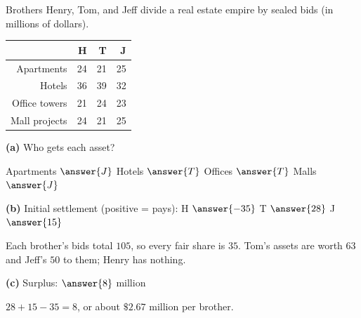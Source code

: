 \documentclass[12pt]{ximera}
\begin{document}
\begin{problem}
Brothers Henry, Tom, and Jeff divide a real estate empire by sealed bids (in millions of
dollars).
\begin{center}
\begin{tabular}{r|rrr}
 & H & T & J\\\hline
Apartments & 24 & 21 & 25\\
Hotels & 36 & 39 & 32\\
Office towers & 21 & 24 & 23\\
Mall projects & 24 & 21 & 25
\end{tabular}
\end{center}

\begin{prompt}
\textbf{(a)} Who gets each asset?

Apartments $\answer{J}$ \quad Hotels $\answer{T}$ \quad Offices $\answer{T}$ \quad
Malls $\answer{J}$
\end{prompt}

\begin{prompt}
\textbf{(b)} Initial settlement (positive = pays): H $\answer{-35}$ \quad T $\answer{28}$
\quad J $\answer{15}$
\begin{feedback}
Each brother's bids total $105$, so every fair share is $35$. Tom's assets are worth
$63$ and Jeff's $50$ to them; Henry has nothing.
\end{feedback}
\end{prompt}

\begin{prompt}
\textbf{(c)} Surplus: $\answer{8}$ million
\begin{feedback}
$28+15-35=8$, or about $\$2.67$ million per brother.
\end{feedback}
\end{prompt}
\end{problem}
\end{document}
